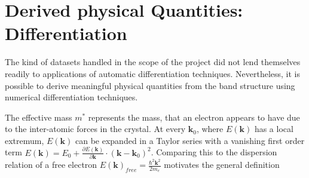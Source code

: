 


\section{Derived physical Quantities: Differentiation}



The kind of datasets handled in the scope of the project did not lend themselves
readily to applications of automatic differentiation techniques. Nevertheless,
it is possible to derive meaningful physical quantities from the band structure
using numerical differentiation techniques.

The effective mass $m^{*}$ represents the mass, that an electron appears to have due to the inter-atomic forces in the crystal. At every $\mathbf{k}_0$, where $E(\mathbf{k})$ has a local extremum, $E(\mathbf{k})$ can be expanded in a Taylor series with a vanishing first order term $E(\mathbf{k}) = E_0 + \frac{\partial E(\mathbf{k})}{\partial \mathbf{k}} \cdot (\mathbf{k}-\mathbf{k}_0)^2$. Comparing this to the dispersion relation of a free electron $E(\mathbf{k})_{free} = \frac{\hbar^2 \mathbf{k}^2}{2 m_e}$ motivates the general definition 

